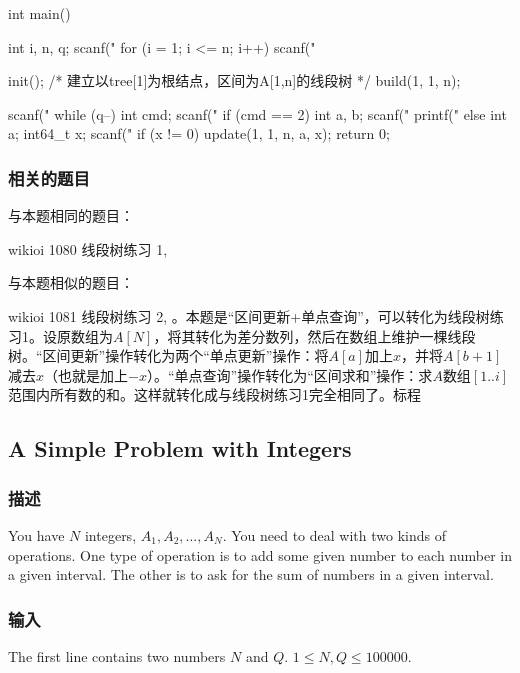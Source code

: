 \begin{Codex}[label=interval_tree1.c]
int main() {
    int i, n, q;
    scanf("%
    for (i = 1; i <= n; i++) scanf("%

    init();
    /* 建立以tree[1]为根结点，区间为A[1,n]的线段树 */
    build(1, 1, n);

    scanf("%
    while (q--) {
        int cmd;
        scanf("%
        if (cmd == 2) {
            int a, b;
            scanf("%
            printf("%
        } else {
            int a;
            int64_t x;
            scanf("%
            if (x != 0) update(1, 1, n, a, x);
        }
    }
    return 0;
}
\end{Codex}

\subsubsection{相关的题目}
与本题相同的题目：
\begindot
\item wikioi 1080 线段树练习 1, 
\myenddot

与本题相似的题目：
\begindot
\item  wikioi 1081 线段树练习 2,  。本题是“区间更新+单点查询”，可以转化为线段树练习1。设原数组为$A[N]$，将其转化为差分数列，然后在数组上维护一棵线段树。“区间更新”操作转化为两个“单点更新”操作：将$A[a]$加上$x$，并将$A[b+1]$减去$x$（也就是加上$-x$）。“单点查询”操作转化为“区间求和”操作：求$A$数组$[1..i]$范围内所有数的和。这样就转化成与线段树练习1完全相同了。标程 
\myenddot


\subsection{A Simple Problem with Integers} %
\subsubsection{描述}
You have $N$ integers, $A_1, A_2, ... , A_N$. You need to deal with two kinds of operations. One type of operation is to add some given number to each number in a given interval. The other is to ask for the sum of numbers in a given interval.

\subsubsection{输入}
The first line contains two numbers $N$ and $Q$. $1 \leq N,Q \leq 100000$.

